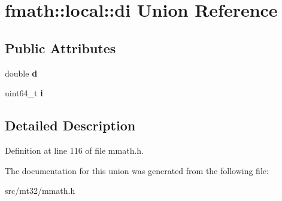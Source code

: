 \hypertarget{unionfmath_1_1local_1_1di}{\section{fmath\-:\-:local\-:\-:di Union Reference}
\label{unionfmath_1_1local_1_1di}
}
\subsection*{Public Attributes}
\begin{DoxyCompactItemize}
\item 
\hypertarget{unionfmath_1_1local_1_1di_acb476477a540e16d6165446a477950a2}{double {\bfseries d}}\label{unionfmath_1_1local_1_1di_acb476477a540e16d6165446a477950a2}

\item 
\hypertarget{unionfmath_1_1local_1_1di_ab6f8af8ccb0597bd7048485a43c5e739}{uint64\-\_\-t {\bfseries i}}\label{unionfmath_1_1local_1_1di_ab6f8af8ccb0597bd7048485a43c5e739}

\end{DoxyCompactItemize}


\subsection{Detailed Description}


Definition at line 116 of file mmath.\-h.



The documentation for this union was generated from the following file\-:\begin{DoxyCompactItemize}
\item 
src/mt32/mmath.\-h\end{DoxyCompactItemize}
